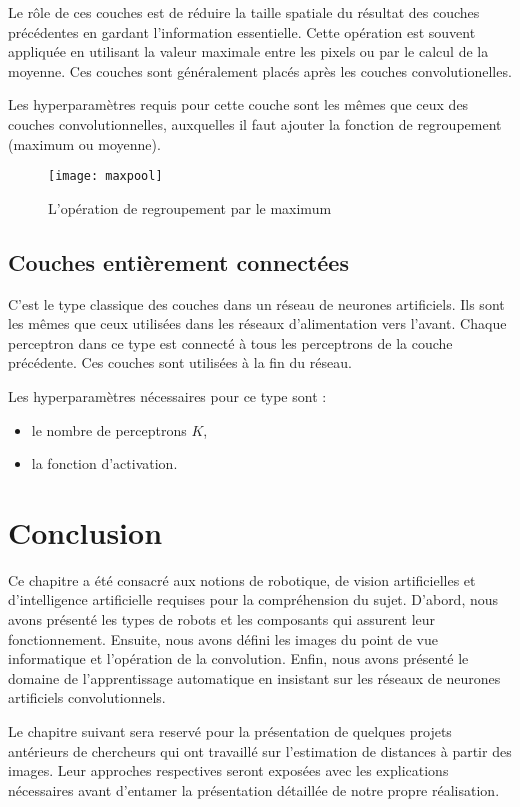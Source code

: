 Le rôle de ces couches est de réduire la taille spatiale du résultat des couches
précédentes en gardant l'information essentielle. Cette opération est souvent
appliquée en utilisant la valeur maximale entre les pixels ou par le calcul de
la moyenne. Ces couches sont généralement placés après les couches
convolutionelles.

Les hyperparamètres requis pour cette couche sont les mêmes que ceux des couches
convolutionnelles, auxquelles il faut ajouter la fonction de regroupement
(maximum ou moyenne).

\begin{figure}[H]
\begin{center}
\texttt{[image: maxpool]}
\caption{L'opération de regroupement par le maximum}{\cite{karpathy2016cs231n}}
\end{center}
\end{figure}

\subsection{Couches entièrement connectées}

C'est le type classique des couches dans un réseau de neurones artificiels. Ils
sont les mêmes que ceux utilisées dans les réseaux d'alimentation vers l'avant.
Chaque perceptron dans ce type est connecté à tous les perceptrons de la couche
précédente. Ces couches sont utilisées à la fin du réseau.

Les hyperparamètres nécessaires pour ce type sont :

\begin{itemize}
  \item le nombre de perceptrons $K$,
  \item la fonction d'activation.
\end{itemize}

\section{Conclusion}

Ce chapitre a été consacré aux notions de robotique, de vision artificielles
et d'intelligence artificielle requises pour la compréhension du sujet.
D'abord, nous avons présenté les types de robots et les composants qui assurent leur
fonctionnement. Ensuite, nous avons défini les images du point de vue
informatique et l'opération de la convolution. Enfin, nous avons présenté le
domaine de l'apprentissage automatique en insistant sur les réseaux de
neurones artificiels convolutionnels.

Le chapitre suivant sera reservé pour la présentation de quelques projets antérieurs
de chercheurs qui ont travaillé sur l'estimation de distances à partir des images.
Leur approches respectives seront exposées avec les explications nécessaires avant
d'entamer la présentation détaillée de notre propre réalisation.
